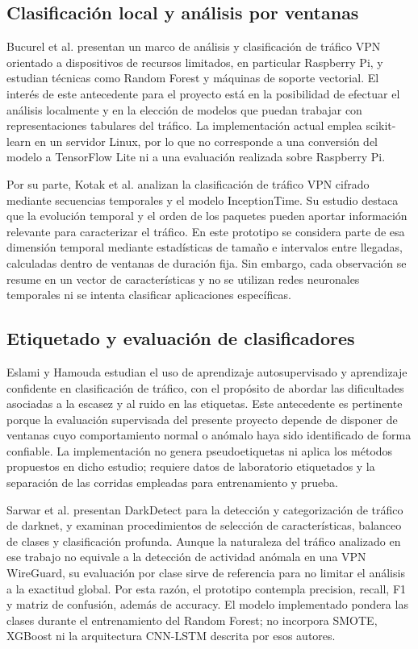 \documentclass[conference]{IEEEtran}
\begin{document}
\subsection{Clasificación local y análisis por ventanas}
Bucurel et al. \cite{ref6} presentan un marco de análisis y clasificación de tráfico VPN orientado a dispositivos de recursos limitados, en particular Raspberry Pi, y estudian técnicas como Random Forest y máquinas de soporte vectorial. El interés de este antecedente para el proyecto está en la posibilidad de efectuar el análisis localmente y en la elección de modelos que puedan trabajar con representaciones tabulares del tráfico. La implementación actual emplea scikit-learn en un servidor Linux, por lo que no corresponde a una conversión del modelo a TensorFlow Lite ni a una evaluación realizada sobre Raspberry Pi.

Por su parte, Kotak et al. \cite{ref4} analizan la clasificación de tráfico VPN cifrado mediante secuencias temporales y el modelo InceptionTime. Su estudio destaca que la evolución temporal y el orden de los paquetes pueden aportar información relevante para caracterizar el tráfico. En este prototipo se considera parte de esa dimensión temporal mediante estadísticas de tamaño e intervalos entre llegadas, calculadas dentro de ventanas de duración fija. Sin embargo, cada observación se resume en un vector de características y no se utilizan redes neuronales temporales ni se intenta clasificar aplicaciones específicas.

\subsection{Etiquetado y evaluación de clasificadores}
Eslami y Hamouda \cite{ref2} estudian el uso de aprendizaje autosupervisado y aprendizaje confidente en clasificación de tráfico, con el propósito de abordar las dificultades asociadas a la escasez y al ruido en las etiquetas. Este antecedente es pertinente porque la evaluación supervisada del presente proyecto depende de disponer de ventanas cuyo comportamiento normal o anómalo haya sido identificado de forma confiable. La implementación no genera pseudoetiquetas ni aplica los métodos propuestos en dicho estudio; requiere datos de laboratorio etiquetados y la separación de las corridas empleadas para entrenamiento y prueba.

Sarwar et al. \cite{ref3} presentan DarkDetect para la detección y categorización de tráfico de darknet, y examinan procedimientos de selección de características, balanceo de clases y clasificación profunda. Aunque la naturaleza del tráfico analizado en ese trabajo no equivale a la detección de actividad anómala en una VPN WireGuard, su evaluación por clase sirve de referencia para no limitar el análisis a la exactitud global. Por esta razón, el prototipo contempla precision, recall, F1 y matriz de confusión, además de accuracy. El modelo implementado pondera las clases durante el entrenamiento del Random Forest; no incorpora SMOTE, XGBoost ni la arquitectura CNN-LSTM descrita por esos autores.
\end{document}
